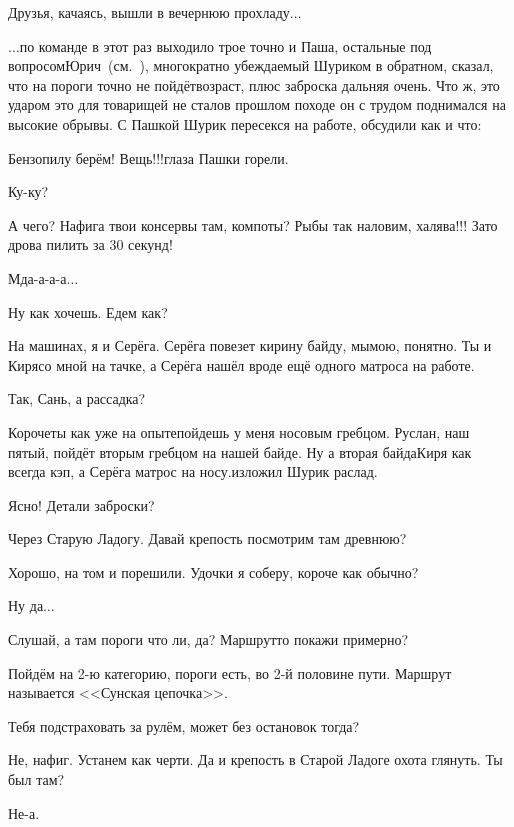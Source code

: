Друзья, качаясь, вышли в вечернюю прохладу$\ldots$

\vspace{1cm}

$\ldots$по команде в этот раз выходило трое точно и Паша, остальные под вопросом\mdash Юрич~(см.~\cite{СоболевВепсскаяЛетопись}), многократно убеждаемый Шуриком в обратном, сказал, что на пороги точно не пойдёт\mdash возраст, плюс заброска дальняя очень. Что ж, это ударом это для товарищей не стало\mdash в прошлом походе он с трудом поднимался на высокие обрывы. С Пашкой Шурик пересекся на работе, обсудили как и что:

\diagdash Бензопилу берём! Вещь!!!\mdash глаза Пашки горели.

\diagdash Ку-ку?

\diagdash А чего? Нафига твои консервы там, компоты? Рыбы так наловим, халява!!! Зато дрова пилить за 30 секунд!

\diagdash Мда-а-а-а$\ldots$

\diagdash Ну как хочешь. Едем как?

\diagdash На машинах, я и Серёга. Серёга повезет кирину байду, мы\mdash мою, понятно. Ты и Киря\mdash со мной на тачке, а Серёга нашёл вроде ещё одного матроса на работе.

\diagdash Так, Сань, а рассадка?

\diagdash Короче\mdash ты как уже на опыте\mdash пойдешь у меня носовым гребцом. Руслан, наш пятый, пойдёт вторым гребцом на нашей байде. Ну а вторая байда\mdash Киря как всегда кэп, а Серёга матрос на носу.\mdash изложил Шурик раслад.

\diagdash Ясно! Детали заброски?

\diagdash Через Старую Ладогу. Давай крепость посмотрим там древнюю?

\diagdash Хорошо, на том и порешили. Удочки я соберу, короче как обычно?

\diagdash Ну да$\ldots$

\diagdash Слушай, а там пороги что ли, да? Маршрут\sdash то покажи примерно?

\diagdash Пойдём на 2-ю категорию, пороги есть, во 2-й половине пути. Маршрут называется <<Сунская цепочка>>.

\diagdash Тебя подстраховать за рулём, может без остановок тогда?

\diagdash Не, нафиг. Устанем как черти. Да и крепость в Старой Ладоге охота глянуть. Ты был там?

\diagdash Не-а.

